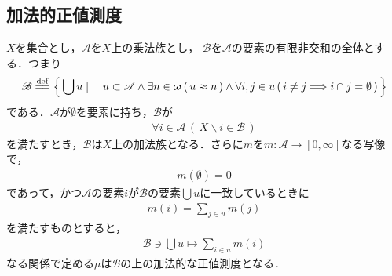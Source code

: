 \subsection{加法的正値測度}
		\begin{screen}
			\begin{thm}[加法族と加法的測度の構成]\label{thm:forming_finitely_additive_class}
				$X$を集合とし，$\mathscr{A}$を$X$上の乗法族とし，
				$\mathscr{B}$を$\mathscr{A}$の要素の有限非交和の全体とする．つまり
				\begin{align}
					\mathscr{B} \defeq \Set{\bigcup u}{u \subset \mathscr{A} \wedge \exists n \in \Natural\,
					(\, u \eqp n\, ) \wedge \forall i,j \in u\, (\, i \neq j \Longrightarrow i \cap j = \emptyset\, )}
				\end{align}
				である．$\mathscr{A}$が$\emptyset$を要素に持ち，$\mathscr{B}$が
				\begin{align}
					\forall i \in \mathscr{A}\, (\, X\backslash i \in \mathscr{B}\, )
				\end{align}
				を満たすとき，$\mathscr{B}$は$X$上の加法族となる．さらに$m$を$m:\mathscr{A} \longrightarrow [0,\infty]$なる写像で，
				\begin{align}
					m(\emptyset) = 0
				\end{align}
				であって，かつ$\mathscr{A}$の要素$i$が$\mathscr{B}$の要素$\bigcup u$に一致しているときに
				\begin{align}
					m(i) = \sum_{j \in u} m(j)
				\end{align}
				を満たすものとすると，
				\begin{align}
					\mathscr{B} \ni \bigcup u \longmapsto \sum_{i \in u} m(i)
				\end{align}
				なる関係で定める$\mu$は$\mathscr{B}$の上の加法的な正値測度となる．
			\end{thm}
		\end{screen}
		
